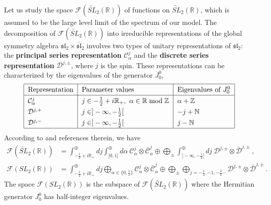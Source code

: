 \documentclass[12pt, a4paper, notitlepage, twoside]{report}
\numberwithin{equation}{section}
\theoremstyle{break}
\begin{document}
Let us study the space $\mathcal{F}(\widetilde{SL}_2(\mathbb{R}))$ of functions on $\widetilde{SL}_2(\mathbb{R})$, which is assumed to be the large level limit of the spectrum of our model. 
The decomposition of $\mathcal{F}(\widetilde{SL}_2(\mathbb{R}))$ into irreducible representations of the global symmetry algebra $\mathfrak{sl}_2\times \overline{\mathfrak{sl}}_2$ involves two types of unitary representations of $\mathfrak{sl}_2$: the \textbf{\boldmath principal series representation} $\mathcal{C}^j_\alpha$ and the \textbf{\boldmath discrete series representation} $\mathcal{D}^{j,\pm}$, where $j$ is the spin. 
These representations can be characterized by the eigenvalues of the generator $J_0^0$,
\begin{align} 
\renewcommand{\arraystretch}{1.3}
\begin{tabular}{|l|l|l|}
  \hline
Representation & Parameter values & Eigenvalues of $J_0^0$
\\
\hline 
$\mathcal{C}^j_\alpha$  & $j\in -\tfrac12+i{\mathbb{R}}_+,\ \alpha\in{\mathbb{R}}\bmod {\mathbb{Z}}$ &  $\alpha + {\mathbb{Z}}$ 
\\
$\mathcal{D}^{j,+}$ & $j\in]-\infty,-\tfrac12[$ & $-j+{\mathbb{N}}$
\\
$\mathcal{D}^{j,-}$ & $j\in]-\infty,-\tfrac12[$ & $j-{\mathbb{N}}$
\\
\hline 
 \end{tabular}
\label{rpe}
\end{align}
According to \cite{rib09} and references therein, we have
\begin{align}
 \mathcal{F}(\widetilde{SL}_2(\mathbb{R})) &= \int^\oplus_{-\frac12+i{\mathbb{R}}_+} dj \int^\oplus_{]0,1[} d\alpha\ \mathcal{C}^j_\alpha \otimes \bar{\mathcal{C}}^j_{\alpha} \oplus \bigoplus_\pm \int^\oplus_{]-\infty,-\frac12[} dj\ \mathcal{D}^{j,\pm}\otimes \bar{\mathcal{D}}^{j,\pm} \ ,
\label{fst}
\\
 \mathcal{F}(SL_2(\mathbb{R})) &= \int^\oplus_{-\frac12+i{\mathbb{R}}_+} dj \bigoplus_{\alpha\in\{0,\frac12\}} \mathcal{C}^j_\alpha \otimes \bar{\mathcal{C}}^j_{\alpha} \oplus \bigoplus_\pm \bigoplus_{j=-\frac12, -1,-\frac32 \cdots} \mathcal{D}^{j,\pm}\otimes \bar{\mathcal{D}}^{j,\pm} \ .
\end{align}
The space $\mathcal{F}(SL_2(\mathbb{R}))$ is the subspace of $\mathcal{F}(\widetilde{SL}_2(\mathbb{R}))$ where the Hermitian generator $J_0^0$ has half-integer eigenvalues.
\end{document}
